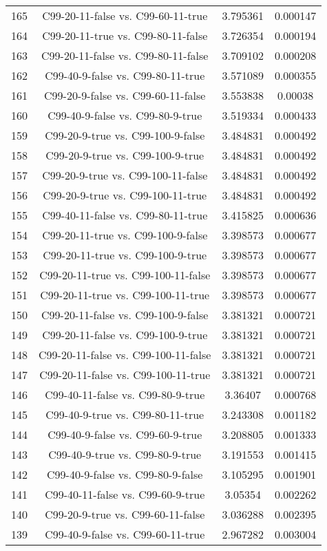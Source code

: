 \documentclass[a4paper,10pt]{article}
\begin{document}
\begin{landscape}
\begin{table}[!htp]
\begin{tabular}{cccc}
165&C99-20-11-false vs. C99-60-11-true&3.795361&0.000147\\
164&C99-20-11-true vs. C99-80-11-false&3.726354&0.000194\\
163&C99-20-11-false vs. C99-80-11-false&3.709102&0.000208\\
162&C99-40-9-false vs. C99-80-11-true&3.571089&0.000355\\
161&C99-20-9-false vs. C99-60-11-false&3.553838&0.00038\\
160&C99-40-9-false vs. C99-80-9-true&3.519334&0.000433\\
159&C99-20-9-true vs. C99-100-9-false&3.484831&0.000492\\
158&C99-20-9-true vs. C99-100-9-true&3.484831&0.000492\\
157&C99-20-9-true vs. C99-100-11-false&3.484831&0.000492\\
156&C99-20-9-true vs. C99-100-11-true&3.484831&0.000492\\
155&C99-40-11-false vs. C99-80-11-true&3.415825&0.000636\\
154&C99-20-11-true vs. C99-100-9-false&3.398573&0.000677\\
153&C99-20-11-true vs. C99-100-9-true&3.398573&0.000677\\
152&C99-20-11-true vs. C99-100-11-false&3.398573&0.000677\\
151&C99-20-11-true vs. C99-100-11-true&3.398573&0.000677\\
150&C99-20-11-false vs. C99-100-9-false&3.381321&0.000721\\
149&C99-20-11-false vs. C99-100-9-true&3.381321&0.000721\\
148&C99-20-11-false vs. C99-100-11-false&3.381321&0.000721\\
147&C99-20-11-false vs. C99-100-11-true&3.381321&0.000721\\
146&C99-40-11-false vs. C99-80-9-true&3.36407&0.000768\\
145&C99-40-9-true vs. C99-80-11-true&3.243308&0.001182\\
144&C99-40-9-false vs. C99-60-9-true&3.208805&0.001333\\
143&C99-40-9-true vs. C99-80-9-true&3.191553&0.001415\\
142&C99-40-9-false vs. C99-80-9-false&3.105295&0.001901\\
141&C99-40-11-false vs. C99-60-9-true&3.05354&0.002262\\
140&C99-20-9-true vs. C99-60-11-false&3.036288&0.002395\\
139&C99-40-9-false vs. C99-60-11-true&2.967282&0.003004\\

\end{tabular}
\end{table}
\end{landscape}
\end{document}

